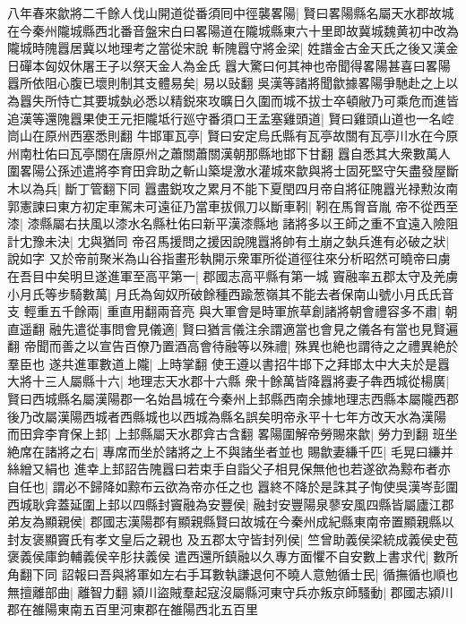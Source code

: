 八年春來歙將二千餘人伐山開道從番須囘中徑襲畧陽|{
	賢曰畧陽縣名屬天水郡故城在今秦州隴城縣西北番音盤宋白曰畧陽道在隴城縣東六十里即故冀城魏黄初中改為隴城時隗囂居冀以地理考之當從宋說}
斬隗囂守將金梁|{
	姓譜金古金天氏之後又漢金日磾本匈奴休屠王子以祭天金人為金氏}
囂大驚曰何其神也帝聞得畧陽甚喜曰畧陽囂所依阻心腹已壞則制其支體易矣|{
	易以䜴翻}
吳漢等諸將聞歙據畧陽爭馳赴之上以為囂失所恃亡其要城埶必悉以精鋭來攻曠日久圍而城不拔士卒頓敝乃可乘危而進皆追漢等還隗囂果使王元拒隴坻行廵守番須口王孟塞雞頭道|{
	賢曰雞頭山道也一名崆峝山在原州西塞悉則翻}
牛邯軍瓦亭|{
	賢曰安定烏氏縣有瓦亭故關有瓦亭川水在今原州南杜佑曰瓦亭關在唐原州之蕭關蕭關漢朝那縣地邯下甘翻}
囂自悉其大衆數萬人圍畧陽公孫述遣將李育田弇助之斬山築堤激水灌城來歙與將士固死堅守矢盡發屋斷木以為兵|{
	斷丁管翻下同}
囂盡鋭攻之累月不能下夏閏四月帝自將征隗囂光禄勲汝南郭憲諫曰東方初定車駕未可遠征乃當車拔佩刀以斷車靷|{
	靷在馬胷音胤}
帝不從西至漆|{
	漆縣屬右扶風以漆水名縣杜佑曰新平漢漆縣地}
諸將多以王師之重不宜遠入險阻計冘豫未決|{
	冘與猶同}
帝召馬援問之援因說隗囂將帥有土崩之埶兵進有必破之狀|{
	說如字}
又於帝前聚米為山谷指畫形執開示衆軍所從道徑往來分析昭然可曉帝曰虜在吾目中矣明旦遂進軍至高平第一|{
	郡國志高平縣有第一城}
竇融率五郡太守及羌虜小月氏等步騎數萬|{
	月氏為匈奴所破餘種西踰葱嶺其不能去者保南山號小月氏氏音支}
輕重五千餘兩|{
	重直用翻兩音亮}
與大軍會是時軍旅草創諸將朝會禮容多不肅|{
	朝直遥翻}
融先遣從事問會見儀適|{
	賢曰猶言儀注余謂適當也會見之儀各有當也見賢遍翻}
帝聞而善之以宣告百僚乃置酒高會待融等以殊禮|{
	殊異也絶也謂待之之禮異絶於羣臣也}
遂共進軍數道上隴|{
	上時掌翻}
使王遵以書招牛邯下之拜邯太中大夫於是囂大將十三人屬縣十六|{
	地理志天水郡十六縣}
衆十餘萬皆降囂將妻子犇西城從楊廣|{
	賢曰西城縣名屬漢陽郡一名始昌城在今秦州上邽縣西南余據地理志西縣本屬隴西郡後乃改屬漢陽西城者西縣城也以西城為縣名誤矣明帝永平十七年方改天水為漢陽}
而田弇李育保上邽|{
	上邽縣屬天水郡弇古含翻}
畧陽圍解帝勞賜來歙|{
	勞力到翻}
班坐絶席在諸將之右|{
	專席而坐於諸將之上不與諸坐者並也}
賜歙妻縑千匹|{
	毛晃曰縑并絲繒又絹也}
進幸上邽詔告隗囂曰若束手自詣父子相見保無他也若遂欲為黥布者亦自任也|{
	謂必不歸降如黥布云欲為帝亦任之也}
囂終不降於是誅其子恂使吳漢岑彭圍西城耿弇蓋延圍上邽以四縣封竇融為安豐侯|{
	融封安豐陽泉蓼安風四縣皆屬廬江郡}
弟友為顯親侯|{
	郡國志漢陽郡有顯親縣賢曰故城在今秦州成紀縣東南帝置顯親縣以封友褒顯竇氏有孝文皇后之親也}
及五郡太守皆封列侯|{
	竺曾助義侯梁統成義侯史苞褒義侯庫鈞輔義侯辛肜扶義侯}
遣西還所鎮融以久專方面懼不自安數上書求代|{
	數所角翻下同}
詔報曰吾與將軍如左右手耳數執謙退何不曉人意勉循士民|{
	循撫循也順也}
無擅離部曲|{
	離智力翻}
潁川盜賊羣起寇沒屬縣河東守兵亦叛京師騷動|{
	郡國志潁川郡在雒陽東南五百里河東郡在雒陽西北五百里}
